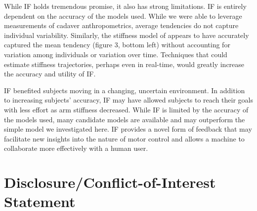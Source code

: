\documentclass{frontiersSCNS} %
\begin{document}
While IF holds tremendous promise, it also has strong limitations. IF is entirely dependent on the accuracy of the models used. While we were able to leverage measurements of cadaver anthropometrics, average tendencies do not capture individual variability. Similarly, the stiffness model of \cite{shadmehr1994adaptive} appears to have accurately captured the mean tendency (figure 3, bottom left) without accounting for variation among individuals or variation over time. Techniques that could estimate stiffness trajectories, perhaps even in real-time, would greatly increase the accuracy and utility of IF.

IF benefited subjects moving in a changing, uncertain environment. In addition to increasing subjects' accuracy, IF may have allowed subjects to reach their goals with less effort as arm stiffness decreased. While IF is limited by the accuracy of the models used, many candidate models are available and may outperform the simple model we investigated here. IF provides a novel form of feedback that may facilitate new insights into the nature of motor control and allows a machine to collaborate more effectively with a human user.


\section*{Disclosure/Conflict-of-Interest Statement}
\end{document}
